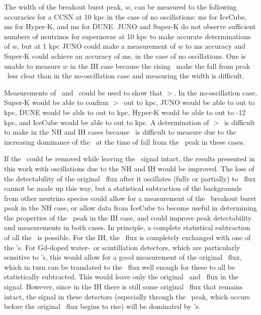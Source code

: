 The width of the breakout burst peak, $w$, can be measured to the
following accuracies for a CCSN at 10 kpc in the case of no
oscillations:  ms for IceCube,  ms for Hyper-K, and  ms for DUNE.  JUNO and Super-K do not observe sufficient numbers of
neutrinos for supernovae at 10 kpc to make accurate determinations of
$w$, but at 1 kpc JUNO could make a measurement of $w$ to  ms
accuracy and Super-K could achieve an accuracy of  ms, in the case of no oscillations.  One is unable to measure
$w$ in the IH case because the rising \backgrounds\ make the fall from
peak \nue\ less clear than in the no-oscillation case and measuring
the width is difficult.

Measurements of \trise\ and \tfall\ could be used
to show that \tfall$>$\trise.    In the
no-oscillation case, 
Super-K would be able to confirm  \tfall$>$\trise\ out to  kpc, JUNO would be able to out to  kpc, 
DUNE would be able to out to  kpc,  Hyper-K would be able to
out to -12 kpc, 
 and IceCube
would be able to out to  kpc.  A
determination of \tfall$>$\trise\ is difficult to make in the NH and
IH cases because \tfall\ is difficult to measure due to 
the increasing dominance of the \backgrounds\ at
the time of fall from the \nue\ peak in these cases.



If the \backgrounds\ could be removed while leaving the \nue\ signal intact, 
the results presented in this work with oscillations due to the NH and
IH would be improved.
 The loss of the detectability of the
original \nue\ flux after it oscillates (fully or partially) to
\nuxpart\ flux cannot be made up this way, but a statistical subtraction
of the backgrounds from other neutrino species could allow for a
measurement of the \nue\ breakout burst peak in the NH case, or allow
data from IceCube to become useful in determining the properties of
the \nue\ peak in the IH case, and could improve peak detectability
and measurements in both cases.  In principle, a complete statistical
subtraction of all the \backgrounds\ is possible.
For the IH, the \anue\ flux is completely exchanged with one of 
the \nuxanti's.  For Gd-doped water-\cer\ or scintillation detectors,
which are particularly sensitive to \anue's,
this would allow for a good measurement of the original \nuxanti\ flux, 
which in turn can be translated to the \nuxpart\ flux well enough for
these to all be statistically subtracted.  This would leave only the
original \nue\ and \anue\ flux in the signal.
 However, since in the IH there is still some original \nue\ flux 
that remains intact, the signal in these detectors (especially through
the \nue\ peak, which occurs before the original \anue\ flux begins to
rise) will be dominated by \nue's.

